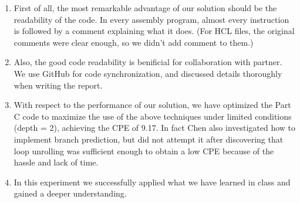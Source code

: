 \documentclass{article}
\begin{document}
\begin{enumerate}
  \item First of all, the most remarkable advantage of our solution should be the readability of the code. In every assembly program, almost every instruction is followed by a comment explaining what it does. (For HCL files, the original comments were clear enough, so we didn't add comment to them.)
  \item Also, the good code readability is benificial for collaboration with partner. We use GitHub for code synchronization, and discussed details thoroughly when writing the report.
  \item With respect to the performance of our solution, we have optimized the Part C code to maximize the use of the above techniques under limited conditions (depth = 2), achieving the CPE of 9.17. In fact Chen also investigated how to implement branch prediction, but did not attempt it after discovering that loop unrolling was sufficient enough to obtain a low CPE because of the hassle and lack of time.
  \item In this experiment we successfully applied what we have learned in class and gained a deeper understanding.
\end{enumerate}
\end{document}
